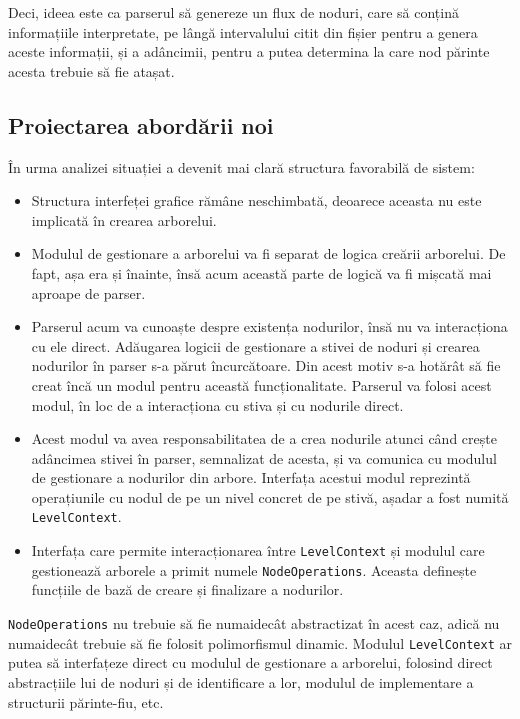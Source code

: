 \documentclass[a4paper,12pt]{report}
\begin{document}
Deci, ideea este ca parserul să genereze un flux de noduri,
care să conțină informațiile interpretate,
pe lângă intervalului citit din fișier pentru a genera aceste informații,
și a adâncimii, pentru a putea determina la care nod părinte acesta trebuie să fie atașat.

\subsection{Proiectarea abordării noi}

În urma analizei situației a devenit mai clară structura favorabilă de sistem:
\begin{itemize}
    \item 
        Structura interfeței grafice rămâne neschimbată, 
        deoarece aceasta nu este implicată în crearea arborelui.

    \item
        Modulul de gestionare a arborelui va fi separat de logica creării arborelui.
        De fapt, așa era și înainte, însă acum această parte de logică va fi mișcată mai aproape de parser.
        
    \item
        Parserul acum va cunoaște despre existența nodurilor, însă nu va interacționa cu ele direct.
        Adăugarea logicii de gestionare a stivei de noduri și crearea nodurilor în parser s-a părut încurcătoare.
        Din acest motiv s-a hotărât să fie creat încă un modul pentru această funcționalitate.
        Parserul va folosi acest modul, în loc de a interacționa cu stiva și cu nodurile direct.

    \item
        Acest modul va avea responsabilitatea de a crea nodurile atunci când crește adâncimea stivei în parser,
        semnalizat de acesta, și va comunica cu modulul de gestionare a nodurilor din arbore.
        Interfața acestui modul reprezintă operațiunile cu nodul de pe un nivel concret de pe stivă, 
        așadar a fost numită \texttt{LevelContext}.

    \item
        Interfața care permite interacționarea între \texttt{LevelContext}
        și modulul care gestionează arborele a primit numele \texttt{NodeOperations}.
        Aceasta definește funcțiile de bază de creare și finalizare a nodurilor.
\end{itemize}

\texttt{NodeOperations} nu trebuie să fie numaidecât abstractizat în acest caz,
adică nu numaidecât trebuie să fie folosit polimorfismul dinamic.
Modulul \texttt{LevelContext} ar putea să interfațeze direct cu modulul de gestionare a arborelui,
folosind direct abstracțiile lui de noduri și de identificare a lor,
modulul de implementare a structurii părinte-fiu, etc.
\end{document}
